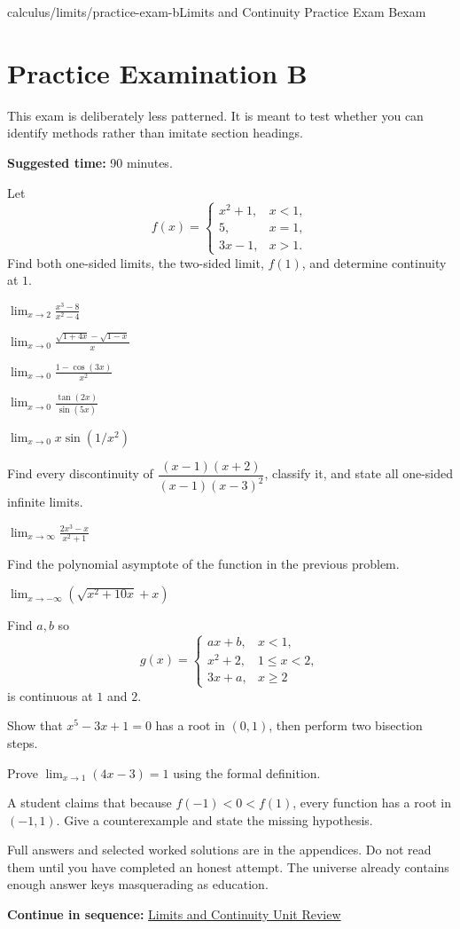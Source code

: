 \documentclass[11pt,openany]{book}
\theoremstyle{bgplain}
\newcommand{\webnext}[2]{%
  \par\addvspace{1.2em}\noindent{\color{BGLine}\rule{\textwidth}{0.35pt}}\par\smallskip
  {\small\color{BGGray}\textbf{Continue in sequence:} \hyperlink{web:#1}{#2}}\par
}
\begin{document}
\begin{webpage}{calculus/limits/practice-exam-b}{Limits and Continuity Practice Exam B}{exam}
\section{Practice Examination B}

This exam is deliberately less patterned. It is meant to test whether you can identify methods rather than imitate section headings.

\textbf{Suggested time:} 90 minutes.

\begin{bgexercises}[label=\textbf{B\arabic*.}]
  \item Let
  \[
    f(x)=\begin{cases}
      x^2+1,&x<1,\\
      5,&x=1,\\
      3x-1,&x>1.
    \end{cases}
  \]
  Find both one-sided limits, the two-sided limit, \(f(1)\), and determine continuity at \(1\).
  \item \(\displaystyle\lim_{x\to2}\frac{x^3-8}{x^2-4}\)
  \item \(\displaystyle\lim_{x\to0}\frac{\sqrt{1+4x}-\sqrt{1-x}}x\)
  \item \(\displaystyle\lim_{x\to0}\frac{1-\cos(3x)}{x^2}\)
  \item \(\displaystyle\lim_{x\to0}\frac{\tan(2x)}{\sin(5x)}\)
  \item \(\displaystyle\lim_{x\to0}x\sin(1/x^2)\)
  \item Find every discontinuity of \(\dfrac{(x-1)(x+2)}{(x-1)(x-3)^2}\), classify it, and state all one-sided infinite limits.
  \item \(\displaystyle\lim_{x\to\infty}\frac{2x^3-x}{x^2+1}\)
  \item Find the polynomial asymptote of the function in the previous problem.
  \item \(\displaystyle\lim_{x\to-\infty}(\sqrt{x^2+10x}+x)\)
  \item Find \(a,b\) so
  \[
    g(x)=\begin{cases}
      ax+b,&x<1,\\
      x^2+2,&1\le x<2,\\
      3x+a,&x\ge2
    \end{cases}
  \]
  is continuous at \(1\) and \(2\).
  \item Show that \(x^5-3x+1=0\) has a root in \((0,1)\), then perform two bisection steps.
  \item Prove \(\lim_{x\to1}(4x-3)=1\) using the formal definition.
  \item A student claims that because \(f(-1)<0<f(1)\), every function has a root in \((-1,1)\). Give a counterexample and state the missing hypothesis.
\end{bgexercises}

Full answers and selected worked solutions are in the appendices. Do not read them until you have completed an honest attempt. The universe already contains enough answer keys masquerading as education.
\webnext{calculus/limits/unit-review}{Limits and Continuity Unit Review}
\end{webpage}
\end{document}
